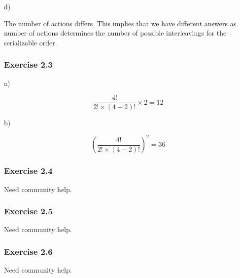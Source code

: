 \documentclass[../../main.tex]{subfiles}
\begin{document}
d)

The number of actions differs. This implies that we have different
answers as number of actions determines the number of possible
interleavings for the serializable order.

\subsubsection*{Exercise 2.3}

a)

$$
\frac{4!}{2! \times (4 - 2)!} \times 2 = 12
$$

b)

$$
\left(\frac{4!}{2! \times (4 - 2)!}\right)^{2} = 36
$$

\subsubsection*{Exercise 2.4}

Need community help.

\subsubsection*{Exercise 2.5}

Need community help.

\subsubsection*{Exercise 2.6}

Need community help.
\end{document}
